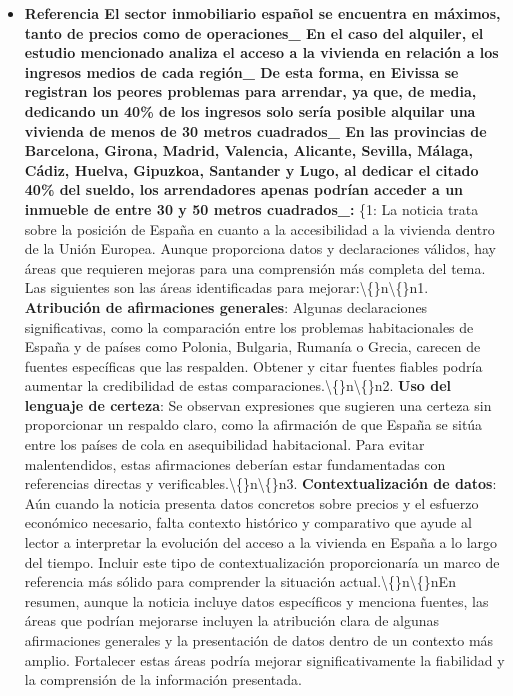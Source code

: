 \documentclass[10pt,a4paper]{article}
\begin{document}
\begin{itemize}[leftmargin=*]
            \item \textbf{Referencia El sector inmobiliario espa\~{n}ol se encuentra en m\'{a}ximos, tanto de precios como de operaciones\_ En el caso del alquiler, el estudio mencionado analiza el acceso a la vivienda en relaci\'{o}n a los ingresos medios de cada regi\'{o}n\_ De esta forma, en Eivissa se registran los peores problemas para arrendar, ya que, de media, dedicando un 40\% de los ingresos solo ser\'{i}a posible alquilar una vivienda de menos de 30 metros cuadrados\_ En las provincias de Barcelona, Girona, Madrid, Valencia, Alicante, Sevilla, M\'{a}laga, C\'{a}diz, Huelva, Gipuzkoa, Santander y Lugo, al dedicar el citado 40\% del sueldo, los arrendadores apenas podr\'{i}an acceder a un inmueble de entre 30 y 50 metros cuadrados\_:} \{{}1{}: {}La noticia trata sobre la posici\'{o}n de Espa\~{n}a en cuanto a la accesibilidad a la vivienda dentro de la Uni\'{o}n Europea. Aunque proporciona datos y declaraciones v\'{a}lidos, hay \'{a}reas que requieren mejoras para una comprensi\'{o}n m\'{a}s completa del tema. Las siguientes son las \'{a}reas identificadas para mejorar:\textbackslash\{\}n\textbackslash\{\}n1. \textbf{Atribuci\'{o}n de afirmaciones generales}: Algunas declaraciones significativas, como la comparaci\'{o}n entre los problemas habitacionales de Espa\~{n}a y de pa\'{i}ses como Polonia, Bulgaria, Ruman\'{i}a o Grecia, carecen de fuentes espec\'{i}ficas que las respalden. Obtener y citar fuentes fiables podr\'{i}a aumentar la credibilidad de estas comparaciones.\textbackslash\{\}n\textbackslash\{\}n2. \textbf{Uso del lenguaje de certeza}: Se observan expresiones que sugieren una certeza sin proporcionar un respaldo claro, como la afirmaci\'{o}n de que {}Espa\~{n}a se sit\'{u}a entre los pa\'{i}ses de cola en {}asequibilidad{} habitacional{}. Para evitar malentendidos, estas afirmaciones deber\'{i}an estar fundamentadas con referencias directas y verificables.\textbackslash\{\}n\textbackslash\{\}n3. \textbf{Contextualizaci\'{o}n de datos}: A\'{u}n cuando la noticia presenta datos concretos sobre precios y el esfuerzo econ\'{o}mico necesario, falta contexto hist\'{o}rico y comparativo que ayude al lector a interpretar la evoluci\'{o}n del acceso a la vivienda en Espa\~{n}a a lo largo del tiempo. Incluir este tipo de contextualizaci\'{o}n proporcionar\'{i}a un marco de referencia m\'{a}s s\'{o}lido para comprender la situaci\'{o}n actual.\textbackslash\{\}n\textbackslash\{\}nEn resumen, aunque la noticia incluye datos espec\'{i}ficos y menciona fuentes, las \'{a}reas que podr\'{i}an mejorarse incluyen la atribuci\'{o}n clara de algunas afirmaciones generales y la presentaci\'{o}n de datos dentro de un contexto m\'{a}s amplio. Fortalecer estas \'{a}reas podr\'{i}a mejorar significativamente la fiabilidad y la comprensi\'{o}n de la informaci\'{o}n presentada.{}

\end{itemize}
\end{document}
